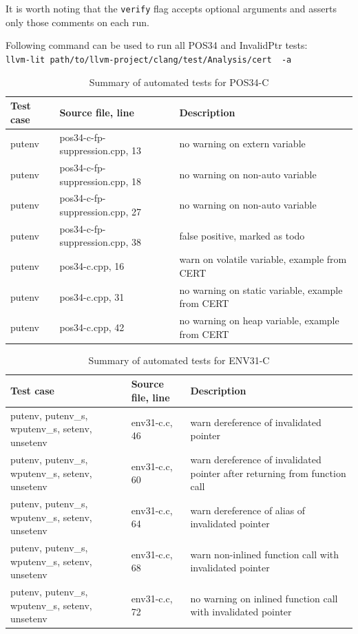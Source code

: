 It is worth noting that the \lstinline{verify} flag accepts optional arguments and asserts only those comments on each run. 

Following command can be used to run all POS34 and InvalidPtr tests:  \\ 
\lstinline{llvm-lit path/to/llvm-project/clang/test/Analysis/cert  -a}


\begin{table}[H]
	\centering
	\begin{tabular}{ | m{} | m{} | m{} |}
		\hline
		\textbf{Test case} & \textbf{Source file, line} & \textbf{Description} \\
		\hline \hline
		putenv & pos34-c-fp-suppression.cpp, 13 & no warning on extern variable\\
		\hline
		putenv & pos34-c-fp-suppression.cpp, 18 & no warning on non-auto variable\\
		\hline
		putenv & pos34-c-fp-suppression.cpp, 27 & no warning on non-auto variable\\
		\hline
		putenv & pos34-c-fp-suppression.cpp, 38 & false positive, marked as todo\\
		\hline
		putenv & pos34-c.cpp, 16 & warn on volatile variable, example from CERT\\
		\hline
		putenv & pos34-c.cpp, 31 & no warning on static variable, example from CERT\\
		\hline
		putenv & pos34-c.cpp, 42 & no warning on heap variable, example from CERT\\
		\hline
	\end{tabular}
	\caption{Summary of automated tests for POS34-C}
	\label{tab:tests1}
\end{table}


\begin{table}[H]
	\centering
	\begin{tabular}{ | m{} | m{} | m{} |}
		\hline
		\textbf{Test case} & \textbf{Source file, line} & \textbf{Description} \\
		\hline \hline
		putenv, putenv\_s, wputenv\_s, setenv, unsetenv & env31-c.c, 46 & warn dereference of invalidated pointer\\
		\hline
		putenv, putenv\_s, wputenv\_s, setenv, unsetenv & env31-c.c, 60 & warn dereference of invalidated pointer after returning from function call\\
		\hline
		putenv, putenv\_s, wputenv\_s, setenv, unsetenv & env31-c.c, 64 & warn dereference of alias of invalidated pointer\\
		\hline
		putenv, putenv\_s, wputenv\_s, setenv, unsetenv & env31-c.c, 68 & warn non-inlined function call with invalidated pointer\\
		\hline
		putenv, putenv\_s, wputenv\_s, setenv, unsetenv & env31-c.c, 72 & no warning on inlined function call with invalidated pointer\\
		\hline
	\end{tabular}
	\caption{Summary of automated tests for ENV31-C}
	\label{tab:tests2}
\end{table}

